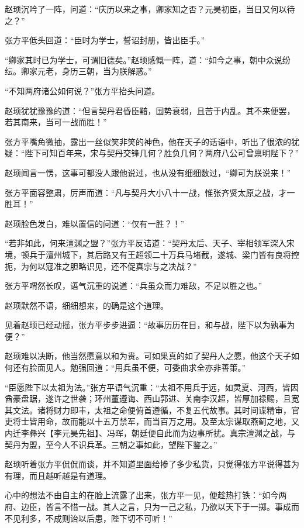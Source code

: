 赵顼沉吟了一阵，问道：“庆历以来之事，卿家知之否？元昊初臣，当日又何以待之？”

张方平低头回道：“臣时为学士，誓诏封册，皆出臣手。”

“卿家其时已为学士，可谓旧德矣。”赵顼感慨一阵，道：“如今之事，朝中众说纷纭。卿家元老，身历三朝，当为朕解惑。”

“不知两府诸公如何说？”张方平抬头问道。

赵顼犹犹豫豫的道：“但言契丹君昏臣黯，国势衰弱，且苦于内乱。其不来便罢，若其南来，当可一战而胜！”

张方平嘴角微抽，露出一丝似笑非笑的神色，他在天子的话语中，听出了很浓的犹疑：“陛下可知百年来，宋与契丹交锋几何？胜负几何？两府八公可曾禀明陛下？”

赵顼闻言一愣，这事可都没人跟他说过，也从没有细细数过，“卿可为朕说来！”

张方平面容整肃，厉声而道：“凡与契丹大小八十一战，惟张齐贤太原之战，才一胜耳！”

赵顼脸色发白，难以置信的问道：“仅有一胜？！”

“若非如此，何来澶渊之盟？”张方平反诘道：“契丹太后、天子、宰相领军深入宋境，顿兵于澶州城下，其后路又有王超领二十万兵马堵截，遂城、梁门皆有良将控扼，为何以寇准之胆略识见，还不促真宗与之决战？”

张方平喟然长叹，语气沉重的说道：“兵虽众而力难敌，不足以胜之也。”

赵顼默然不语，细细想来，的确是这个道理。

见着赵顼已经动摇，张方平步步进逼：“故事历历在目，和与战，陛下以为孰事为便？”

赵顼难以决断，他当然愿意以和为贵。可如果真的如了契丹人之愿，他这个天子如何还有脸面见人。勉强回道：“用兵虽不便，可委曲求全亦非善策。”

“臣愿陛下以太祖为法。”张方平语气沉重：“太祖不用兵于远，如灵夏、河西，皆因酋豪盘踞，遂许之世袭；环州董遵诲、西山郭进、关南李汉超，皆厚加禄赐，且宽其文法。诸将财力即丰，太祖之命便俯首遵循，不复五代故事。其时间谍精审，官吏将士皆用命，故而能以十五万禁军，而当百万之用。及至太宗谋取燕蓟之地，又内迁李彝兴【李元昊先祖】、冯晖，朝廷便自此而为边事所扰。真宗澶渊之战，与契丹为盟，至今人不识兵革。三朝之事如此，望陛下鉴之。”

赵顼听着张方平侃侃而谈，并不知道里面给掺了多少私货，只觉得张方平说得甚为有理，而且越听越是有道理。

心中的想法不由自主的在脸上流露了出来，张方平一见，便趁热打铁：“如今两府、边臣，皆言不惜一战。其人之言，只为一己之私，乃欲以天下于一掷。事成而不见利多，不成则诒以后患，陛下切不可听！”


